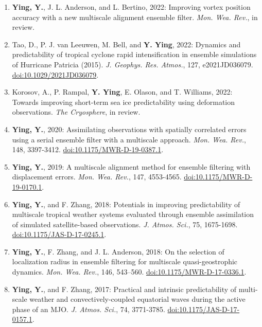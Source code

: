 \begin{enumerate}
\item \textbf{Ying, Y.}, J. L. Anderson, and L. Bertino, 2022: Improving vortex position accuracy with a new multiscale alignment ensemble filter. 
\textit{Mon. Wea. Rev.}, in review.

\item Tao, D., P. J. van Leeuwen, M. Bell, and \textbf{Y. Ying}, 2022: Dynamics and predictability of tropical cyclone rapid intensification in ensemble simulations of Hurricane Patricia (2015). 
\textit{J. Geophys. Res. Atmos.}, 127, e2021JD036079. 
\href{https://doi.org/10.1029/2021JD036079}{doi:10.1029/2021JD036079}.

\item Korosov, A., P. Rampal, \textbf{Y. Ying}, E. Olason, and T. Williams, 2022: Towards improving short-term sea ice predictability using deformation observations. 
\textit{The Cryosphere}, in review.

\item \textbf{Ying, Y.}, 2020: Assimilating observations with spatially correlated errors using a serial ensemble filter with a multiscale approach. 
\textit{Mon. Wea. Rev.}, 148, 3397-3412. 
\href{https://doi.org/10.1175/MWR-D-19-0387.1}{doi:10.1175/MWR-D-19-0387.1}.

\item \textbf{Ying, Y.}, 2019: A multiscale alignment method for ensemble filtering with displacement errors. 
\textit{Mon. Wea. Rev.}, 147, 4553-4565. 
\href{https://doi.org/10.1175/MWR-D-19-0170.1}{doi:10.1175/MWR-D-19-0170.1}.

\item \textbf{Ying, Y.}, and F. Zhang, 2018: Potentials in improving predictability of multiscale tropical weather systems evaluated through ensemble assimilation of simulated satellite-based observations. 
\textit{J. Atmos. Sci.}, 75, 1675-1698. 
\href{https://doi.org/10.1175/JAS-D-17-0245.1}{doi:10.1175/JAS-D-17-0245.1}.

\item \textbf{Ying, Y.}, F. Zhang, and J. L. Anderson, 2018: On the selection of localization radius in ensemble filtering for multiscale quasi-geostrophic dynamics. 
\textit{Mon. Wea. Rev.}, 146, 543–560. 
\href{https://doi.org/10.1175/MWR-D-17-0336.1}{doi:10.1175/MWR-D-17-0336.1}.

\item \textbf{Ying, Y.}, and F. Zhang, 2017: Practical and intrinsic predictability of multi-scale weather and convectively-coupled equatorial waves during the active phase of an MJO. 
\textit{J. Atmos. Sci.}, 74, 3771-3785. 
\href{https://doi.org/10.1175/JAS-D-17-0157.1}{doi:10.1175/JAS-D-17-0157.1}.


\end{enumerate}
